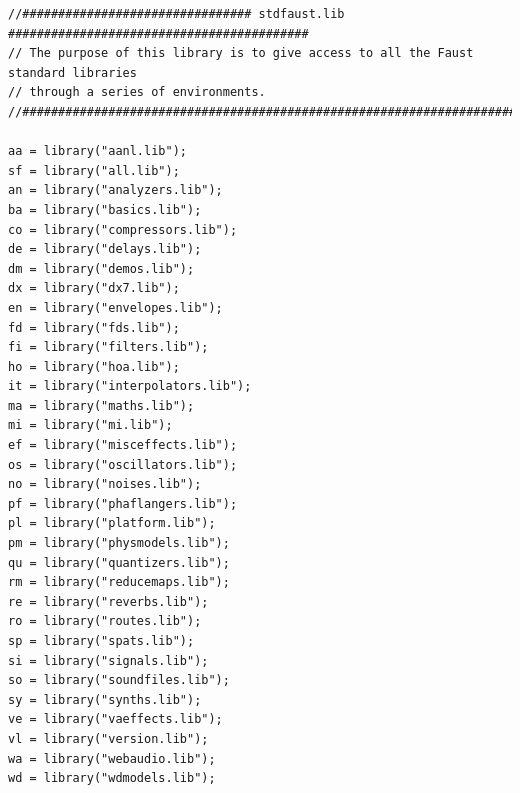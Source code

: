 \documentclass{article}
\begin{document}
\bigskip\bigskip
\begin{lstlisting}[caption=\texttt{stdfaust.lib}]
//################################ stdfaust.lib ##########################################
// The purpose of this library is to give access to all the Faust standard libraries
// through a series of environments.
//########################################################################################

aa = library("aanl.lib");
sf = library("all.lib");
an = library("analyzers.lib");
ba = library("basics.lib");
co = library("compressors.lib");
de = library("delays.lib");
dm = library("demos.lib");
dx = library("dx7.lib");
en = library("envelopes.lib");
fd = library("fds.lib");
fi = library("filters.lib");
ho = library("hoa.lib");
it = library("interpolators.lib");
ma = library("maths.lib");
mi = library("mi.lib");
ef = library("misceffects.lib");
os = library("oscillators.lib");
no = library("noises.lib");
pf = library("phaflangers.lib");
pl = library("platform.lib");
pm = library("physmodels.lib");
qu = library("quantizers.lib");
rm = library("reducemaps.lib");
re = library("reverbs.lib");
ro = library("routes.lib");
sp = library("spats.lib");
si = library("signals.lib");
so = library("soundfiles.lib");
sy = library("synths.lib");
ve = library("vaeffects.lib");
vl = library("version.lib");
wa = library("webaudio.lib");
wd = library("wdmodels.lib");
\end{lstlisting}
\end{document}
